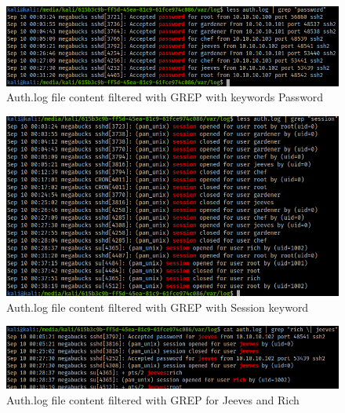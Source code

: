 \documentclass[a4paper,12pt]{article}
\begin{document}
\begin{figure}[H]
	\begin{center}
		\includegraphics[scale = 0.53]{img/act1/authlogPasswd.png} 
	\end{center}
	\caption{Auth.log file content filtered with GREP with keywords Password}
	\label{auth2}
\end{figure}


\begin{figure}[H]
	\begin{center}
		\includegraphics[scale = 0.50]{img/act1/authlogSession.png} 
	\end{center}
	\caption{Auth.log file content filtered with GREP with Session keyword}
	\label{sessionAuth}
\end{figure}


\begin{figure}[H]
	\begin{center}
		\includegraphics[scale = 0.50]{img/act1/jeeveRichLog.png} 
	\end{center}
	\caption{Auth.log file content filtered with GREP for Jeeves and Rich}
	\label{jeevesLog}
\end{figure}
\end{document}
